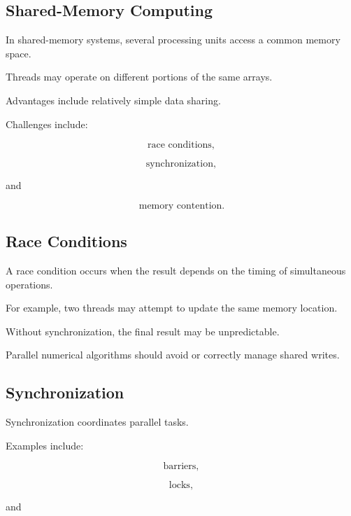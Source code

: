 \subsection{Shared-Memory Computing}
\label{subsec:shared-memory}

In shared-memory systems, several processing units access a common memory
space.

Threads may operate on different portions of the same arrays.

Advantages include relatively simple data sharing.

Challenges include:

\[
\boxed{
\text{race conditions},
}
\]

\[
\boxed{
\text{synchronization},
}
\]

and

\[
\boxed{
\text{memory contention}.
}
\]

\subsection{Race Conditions}
\label{subsec:race-conditions}

A race condition occurs when the result depends on the timing of
simultaneous operations.

For example, two threads may attempt to update the same memory location.

Without synchronization, the final result may be unpredictable.

Parallel numerical algorithms should avoid or correctly manage shared
writes.

\subsection{Synchronization}
\label{subsec:parallel-synchronization}

Synchronization coordinates parallel tasks.

Examples include:

\[
\boxed{
\text{barriers},
}
\]

\[
\boxed{
\text{locks},
}
\]

and

